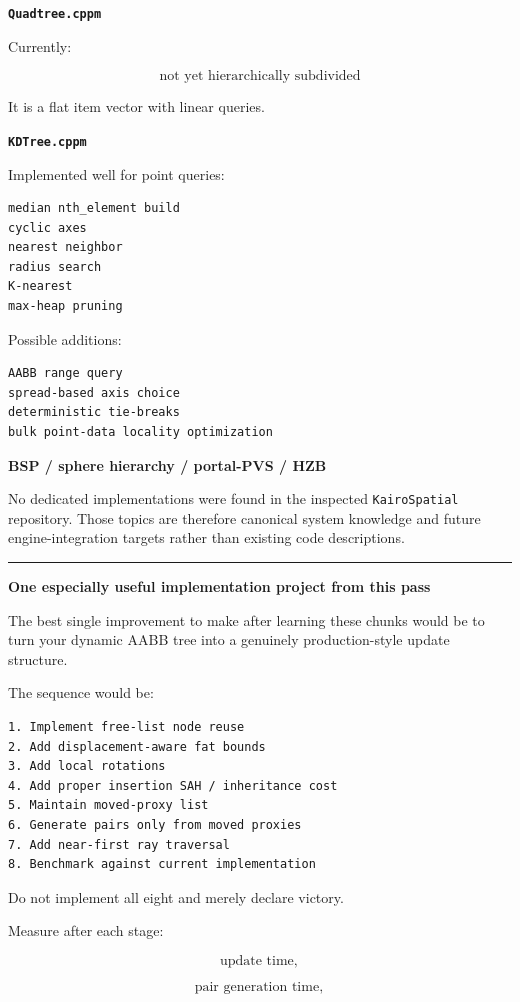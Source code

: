 \textbf{\texttt{Quadtree.cppm}}

Currently:

\[
\boxed{\text{not yet hierarchically subdivided}}
\]

It is a flat item vector with linear queries.

\textbf{\texttt{KDTree.cppm}}

Implemented well for point queries:

\begin{verbatim}
median nth_element build
cyclic axes
nearest neighbor
radius search
K-nearest
max-heap pruning
\end{verbatim}

Possible additions:

\begin{verbatim}
AABB range query
spread-based axis choice
deterministic tie-breaks
bulk point-data locality optimization
\end{verbatim}

\textbf{BSP / sphere hierarchy / portal-PVS / HZB}

No dedicated implementations were found in the inspected \texttt{KairoSpatial} repository. Those topics are therefore canonical system knowledge and future engine-integration targets rather than existing code descriptions.

\begin{center}\rule{0.5\linewidth}{0.5pt}\end{center}

\textbf{One especially useful implementation project from this pass}

The best single improvement to make after learning these chunks would be to turn your dynamic AABB tree into a genuinely production-style update structure.

The sequence would be:

\begin{verbatim}
1. Implement free-list node reuse
2. Add displacement-aware fat bounds
3. Add local rotations
4. Add proper insertion SAH / inheritance cost
5. Maintain moved-proxy list
6. Generate pairs only from moved proxies
7. Add near-first ray traversal
8. Benchmark against current implementation
\end{verbatim}

Do not implement all eight and merely declare victory.

Measure after each stage:

\[
\text{update time},
\]

\[
\text{pair generation time},
\]

